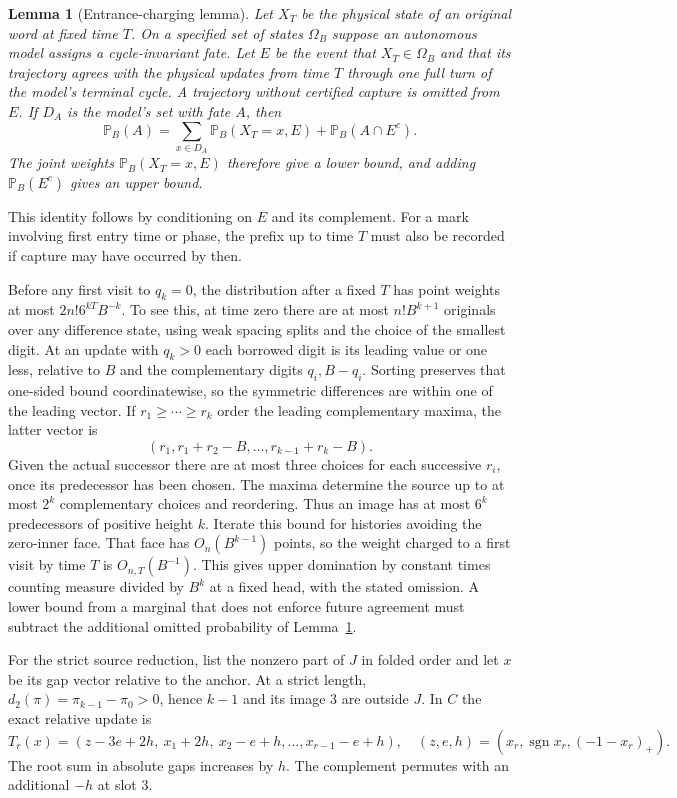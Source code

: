 \documentclass[11pt,reqno]{amsart}
\newtheorem{lemma}[theorem]{Lemma}
\theoremstyle{definition}
\newcommand{\PP}{\mathbb P}
\newcommand{\sgn}{\operatorname{sgn}}
\begin{document}
\begin{lemma}[Entrance-charging lemma]\label{lem:entrance}
Let \(X_T\) be the physical state of an original word at fixed time \(T\). On a specified set of states \(\Omega_B\) suppose an autonomous model assigns a cycle-invariant fate. Let \(E\) be the event that \(X_T\in\Omega_B\) and that its trajectory agrees with the physical updates from time \(T\) through one full turn of the model's terminal cycle. A trajectory without certified capture is omitted from \(E\). If \(D_A\) is the model's set with fate \(A\), then
\[
 \PP_B(A)=\sum_{x\in D_A}\PP_B(X_T=x,E)+\PP_B(A\cap E^c).
\]
The joint weights \(\PP_B(X_T=x,E)\) therefore give a lower bound, and adding \(\PP_B(E^c)\) gives an upper bound.
\end{lemma}

This identity follows by conditioning on \(E\) and its complement. For a mark involving first entry time or phase, the prefix up to time \(T\) must also be recorded if capture may have occurred by then.

Before any first visit to \(q_k=0\), the distribution after a fixed \(T\) has point weights at most \(2n!6^{kT}B^{-k}\). To see this, at time zero there are at most \(n!B^{k+1}\) originals over any difference state, using weak spacing splits and the choice of the smallest digit. At an update with \(q_k>0\) each borrowed digit is its leading value or one less, relative to \(B\) and the complementary digits \(q_i,B-q_i\). Sorting preserves that one-sided bound coordinatewise, so the symmetric differences are within one of the leading vector. If \(r_1\ge\cdots\ge r_k\) order the leading complementary maxima, the latter vector is
\[
 (r_1,r_1+r_2-B,\ldots,r_{k-1}+r_k-B).
\]
Given the actual successor there are at most three choices for each successive \(r_i\), once its predecessor has been chosen. The maxima determine the source up to at most \(2^k\) complementary choices and reordering. Thus an image has at most \(6^k\) predecessors of positive height \(k\). Iterate this bound for histories avoiding the zero-inner face. That face has \(O_n(B^{k-1})\) points, so the weight charged to a first visit by time \(T\) is \(O_{n,T}(B^{-1})\). This gives upper domination by constant times counting measure divided by \(B^k\) at a fixed head, with the stated omission. A lower bound from a marginal that does not enforce future agreement must subtract the additional omitted probability of Lemma~\ref{lem:entrance}.

For the strict source reduction, list the nonzero part of \(J\) in folded order and let \(x\) be its gap vector relative to the anchor. At a strict length, \(d_2(\pi)=\pi_{k-1}-\pi_0>0\), hence \(k-1\) and its image 3 are outside \(J\). In \(C\) the exact relative update is
\begin{equation}\label{eq:root}
 T_r(x)=(z-3e+2h,\ x_1+2h,\ x_2-e+h,\ldots,x_{r-1}-e+h),\quad
 (z,e,h)=(x_r,\sgn x_r,(-1-x_r)_+).
\end{equation}
The root sum in absolute gaps increases by \(h\). The complement permutes with an additional \(-h\) at slot 3.
\end{document}
